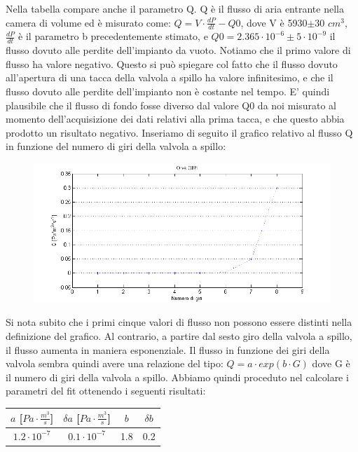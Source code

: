 \documentclass[a4paper,11pt]{article}
\begin{document}
Nella tabella compare anche il parametro Q. Q è il flusso di aria entrante nella camera di volume ed è misurato come:
$Q=V\cdot \frac{dP}{dt}-Q0$, dove V è 5930$\pm 30$ $cm^{3}$,  $\frac{dP}{dt}$ è il parametro b precedentemente stimato, e $Q0 =2.365\cdot10^{-6}\pm 5\cdot10^{-9}$ il flusso dovuto alle perdite dell'impianto da vuoto.  Notiamo che il primo valore di flusso ha valore negativo. Questo si può spiegare col fatto che il flusso dovuto all'apertura di una tacca della valvola a spillo ha valore infinitesimo, e che il flusso dovuto alle perdite dell'impianto non è costante nel tempo. E' quindi plausibile che il flusso di fondo fosse diverso dal valore Q0 da noi misurato al momento dell'acquisizione dei dati relativi alla prima tacca, e che questo abbia prodotto un risultato negativo. Inseriamo di seguito il grafico relativo al flusso Q in funzione del numero di giri della valvola a spillo:
 \begin{center} 
\begin{figure}[htpd]
\hspace{-57.5pt}
\includegraphics{graficoQ.png}
\end{figure}
\end{center}
Si nota subito che i primi cinque valori di flusso non possono essere distinti nella definizione del grafico. Al contrario, a partire dal sesto giro della valvola a spillo, il flusso aumenta in maniera esponenziale. Il flusso in funzione dei giri della valvola sembra quindi avere una relazione del tipo: $Q=a\cdot exp(b\cdot G)$ dove G è il numero di giri della valvola a spillo.  
Abbiamo quindi proceduto nel calcolare i parametri del fit ottenendo i seguenti risultati:

\begin{center}

\begin{tabular}{|c|c|c|c|}
\hline $a$ [$Pa\cdot \frac{m^{3}}{s}$] & $\delta a$ [$Pa\cdot \frac{m^{3}}{s}$] & $b$ & $\delta b$ \\ 
\hline  $1.2\cdot 10^{-7}$ & $0.1\cdot 10^{-7}$ & 1.8 & 0.2 \\ 
\hline 
\end{tabular}
 
\end{center}
\end{document}
